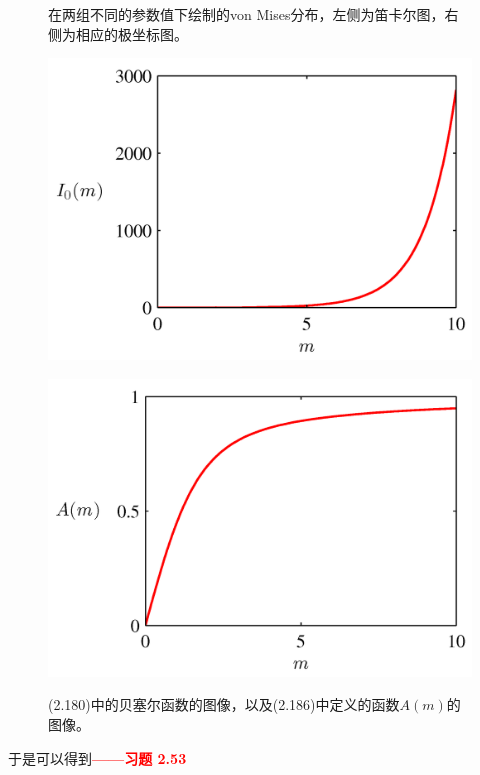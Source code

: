 \documentclass[b5paper]{book}
\numberwithin{equation}{chapter}
\begin{document}
{\begin{figure}[H]
\begin{minipage}[t]{0.5\linewidth}
		\label{fig:2-19b}
		\end{minipage}
		\caption{在两组不同的参数值下绘制的von Mises分布，左侧为笛卡尔图，右侧为相应的极坐标图。}
		\begin{minipage}[t]{0.5\linewidth}
		\centering
		\includegraphics[scale=0.8]{Images/2-20a.png}
		\label{fig:2-20a}
		\end{minipage}
		\begin{minipage}[t]{0.5\linewidth}
		\centering
		\includegraphics[scale=0.8]{Images/2-20b.png}
		\label{fig:2-20b}
		\end{minipage}
		\caption{(2.180)中的贝塞尔函数的图像，以及(2.186)中定义的函数$A(m)$的图像。}
	\end{figure}
	\noindent 于是可以得到\textcolor{red}{\textbf{——习题 2.53}}
}
\end{document}

